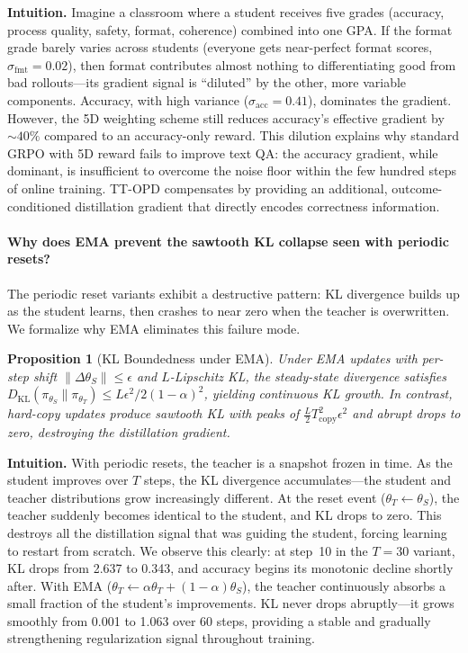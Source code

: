 \documentclass{article}
\newtheorem{proposition}{Proposition}[section]
\begin{document}
\noindent\textbf{Intuition.} Imagine a classroom where a student receives five grades (accuracy, process quality, safety, format, coherence) combined into one GPA. If the format grade barely varies across students (everyone gets near-perfect format scores, $\sigma_\mathrm{fmt}{=}0.02$), then format contributes almost nothing to differentiating good from bad rollouts---its gradient signal is ``diluted'' by the other, more variable components. Accuracy, with high variance ($\sigma_\mathrm{acc}{=}0.41$), dominates the gradient. However, the 5D weighting scheme still reduces accuracy's effective gradient by ${\sim}40\%$ compared to an accuracy-only reward. This dilution explains why standard GRPO with 5D reward fails to improve text QA: the accuracy gradient, while dominant, is insufficient to overcome the noise floor within the few hundred steps of online training. TT-OPD compensates by providing an additional, outcome-conditioned distillation gradient that directly encodes correctness information.

\paragraph{Why does EMA prevent the sawtooth KL collapse seen with periodic resets?}
The periodic reset variants exhibit a destructive pattern: KL divergence builds up as the student learns, then crashes to near zero when the teacher is overwritten. We formalize why EMA eliminates this failure mode.

\begin{proposition}[KL Boundedness under EMA]
\label{prop:kl_bound}
Under EMA updates with per-step shift $\|\Delta\theta_S\| \leq \epsilon$ and $L$-Lipschitz KL, the steady-state divergence satisfies $D_{\mathrm{KL}}(\pi_{\theta_S} \| \pi_{\theta_T}) \leq L\epsilon^2 / 2(1-\alpha)^2$, yielding continuous KL growth. In contrast, hard-copy updates produce sawtooth KL with peaks of $\frac{L}{2}T_\text{copy}^2\epsilon^2$ and abrupt drops to zero, destroying the distillation gradient.
\end{proposition}

\noindent\textbf{Intuition.} With periodic resets, the teacher is a snapshot frozen in time. As the student improves over $T$ steps, the KL divergence accumulates---the student and teacher distributions grow increasingly different. At the reset event ($\theta_T \leftarrow \theta_S$), the teacher suddenly becomes identical to the student, and KL drops to zero. This destroys all the distillation signal that was guiding the student, forcing learning to restart from scratch. We observe this clearly: at step~10 in the $T{=}30$ variant, KL drops from 2.637 to 0.343, and accuracy begins its monotonic decline shortly after. With EMA ($\theta_T \leftarrow \alpha\theta_T + (1{-}\alpha)\theta_S$), the teacher continuously absorbs a small fraction of the student's improvements. KL never drops abruptly---it grows smoothly from 0.001 to 1.063 over 60 steps, providing a stable and gradually strengthening regularization signal throughout training.
\end{document}
